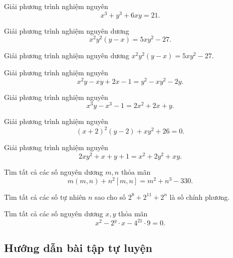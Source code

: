 \begin{btt}
Giải phương trình nghiệm nguyên $$x^3+y^3+6xy=21.$$
\end{btt}

\begin{btt}
Giải phương trình nghiệm nguyên dương $$x^2y^2(y-x)=5xy^2-27.$$
\end{btt}
\begin{btt}
Giải phương trình nghiệm nguyên dương $x^2y^2(y-x)=5xy^2-27.$
\end{btt}
\begin{btt}
Giải phương trình nghiệm nguyên $$x^2y-xy+2x-1=y^2-xy^2-2y.$$
\end{btt}

\begin{btt}
Giải phương trình nghiệm nguyên $$x^3y-x^3-1=2x^2+2x+y.$$
\end{btt}


\begin{btt}
Giải phương trình nghiệm nguyên $$(x+2)^2(y-2)+xy^2+26=0.$$
\end{btt}

\begin{btt}
Giải phương trình nghiệm nguyên 
\[2xy^2+x+y+1=x^2+2y^2+xy.\]
\end{btt}

\begin{btt}
Tìm tất cả các số nguyên dương $m,n$ thỏa mãn 
\[m(m, n)+n^{2}[m, n]=m^{2}+n^{3}-330.\]
\end{btt}

\begin{btt}
Tìm tất cả các số tự nhiên $n$ sao cho số $2^8+2^{11}+2^n$ là số chính phương.
\end{btt}

\begin{btt}
Tìm tất cả các số nguyên dương $x,y$ thỏa mãn $$x^2-2^y\cdot x-4^{21}\cdot 9=0.$$
\end{btt}

\subsection*{Hướng dẫn bài tập tự luyện}

